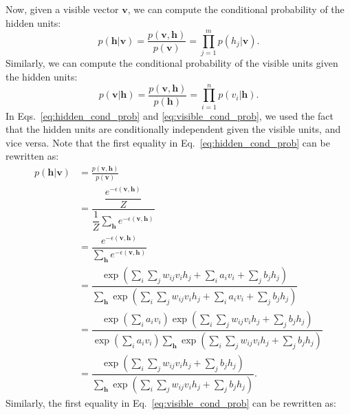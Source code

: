 \documentclass[10pt, a4paper]{article}
\begin{document}
Now, given a visible vector $\mathbf{v}$, we can compute the conditional probability of the hidden units:
\begin{equation}
  \label{eq:hidden_cond_prob}
  p(\mathbf{h}|\mathbf{v}) = \frac{p(\mathbf{v}, \mathbf{h})}{p(\mathbf{v})}
          =\prod_{j=1}^{m}p(h_j|\mathbf{v}).
\end{equation}
Similarly, we can compute the conditional probability of the visible units given the hidden units:
\begin{equation}
  \label{eq:visible_cond_prob}
  p(\mathbf{v}|\mathbf{h}) = \frac{p(\mathbf{v}, \mathbf{h})}{p(\mathbf{h})}
          =\prod_{i=1}^{n}p(v_i|\mathbf{h}).
\end{equation}
In Eqs.~\eqref{eq:hidden_cond_prob} and \eqref{eq:visible_cond_prob},
we used the fact that the hidden units are conditionally independent given the visible units,
and vice versa.
Note that the first equality in Eq.~\eqref{eq:hidden_cond_prob} can be rewritten as:
\begin{align}
   p(\mathbf{h}|\mathbf{v}) &= \frac{p(\mathbf{v}, \mathbf{h})}{p(\mathbf{v})} \nonumber \\
   &= \dfrac{\dfrac{e^{-\epsilon(\mathbf{v}, \mathbf{h})}}{Z}}{\dfrac{1}{Z} \sum_{\mathbf{h}} e^{-\epsilon(\mathbf{v}, \mathbf{h})}} \nonumber \\
   &= \dfrac{e^{-\epsilon(\mathbf{v}, \mathbf{h})}}{\sum_{\mathbf{h}} e^{-\epsilon(\mathbf{v}, \mathbf{h})}} \nonumber \\
   &= \dfrac{\exp\left(\sum_i\sum_j w_{ij} v_i h_j+\sum_i a_i v_i + \sum_j b_j h_j\right)}
   {\sum_{\mathbf{h}} \exp\left(\sum_i\sum_j w_{ij} v_i h_j+\sum_i a_i v_i + \sum_j b_j h_j\right)} \nonumber \\
   &= \dfrac{\exp\left(\sum_i a_i v_i\right)\exp\left(\sum_i\sum_j w_{ij} v_i h_j + \sum_j b_j h_j\right)}
   {\exp\left(\sum_i a_i v_i\right)\sum_{\mathbf{h}} \exp\left(\sum_i\sum_j w_{ij} v_i h_j + \sum_j b_j h_j\right)} \nonumber \\
   &= \dfrac{\exp\left(\sum_i\sum_j w_{ij} v_i h_j + \sum_j b_j h_j\right)}
   {\sum_{\mathbf{h}} \exp\left(\sum_i\sum_j w_{ij} v_i h_j + \sum_j b_j h_j\right)}.
   \label{eq:hidden_cond_prob_rewrite}
\end{align}
Similarly, the first equality in Eq.~\eqref{eq:visible_cond_prob} can be rewritten as:
\end{document}
